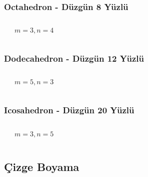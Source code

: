 \documentclass[dvipsnames]{beamer}
\theoremstyle{definition}
\theoremstyle{example}
\theoremstyle{plain}
\begin{document}
\begin{frame}
  \frametitle{Octahedron - Düzgün 8 Yüzlü}

  \begin{columns}
    \begin{center}
    \end{center}

    \begin{center}

      $m=3, n=4$
    \end{center}
  \end{columns}
\end{frame}

\begin{frame}
  \frametitle{Dodecahedron - Düzgün 12 Yüzlü}

  \begin{columns}
    \begin{center}
    \end{center}

    \begin{center}

      $m=5, n=3$
    \end{center}
  \end{columns}
\end{frame}

\begin{frame}
  \frametitle{Icosahedron - Düzgün 20 Yüzlü}

  \begin{columns}
    \begin{center}
    \end{center}

    $m=3, n=5$
  \end{columns}
\end{frame}

\subsection{Çizge Boyama}

\end{document}
